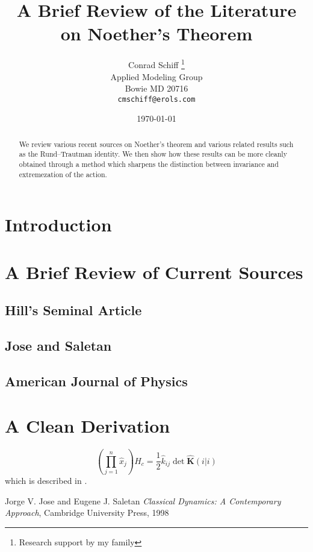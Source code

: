 \documentclass[twocolumn]{article}
\begin{document}
\title{A Brief Review of the Literature on Noether's Theorem}
\author{Conrad Schiff \thanks{Research support by my family} \\
        Applied Modeling Group\\
	  Bowie MD 20716\\
	  \texttt{cmschiff@erols.com}}
\date{\today}
\maketitle

\begin{abstract}
We review various recent sources on Noether's theorem and various 
related results such as the Rund--Trautman identity.  We then show how 
these results can be more cleanly obtained through a method which sharpens 
the distinction between invariance and extremezation of the action.
\end{abstract}

\section{Introduction}\label{S:intro}

\section{A Brief Review of Current Sources}\label{S:review}

\subsection{Hill's Seminal Article}\label{SS:H}

\subsection{Jose and Saletan}\label{SS:JS}

\subsection{American Journal of Physics}\label{SS:AMJ}

\section{A Clean Derivation}

\[
	\left( \prod_{j=1}^{n} {\hat x}_{j} \right) H_{c}
         = \frac{1}{2} {\hat k}_{ij} \det \hat{ \mathbf{K} }(i|i)
\]
which is described in \cite{J&S98}.

\begin{thebibliography}{99}
  Jorge V. Jose and Eugene J. Saletan 
  \emph{Classical Dynamics: A Contemporary Approach},
  Cambridge University Press, 1998
\end{thebibliography}
\end{document}
